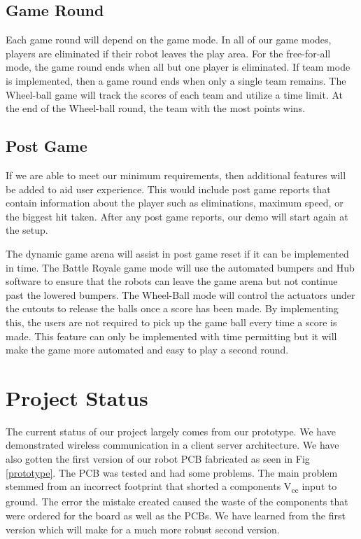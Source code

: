 \documentclass[11pt]{ieeeconf}
\begin{document}
\subsection{Game Round}
Each game round will depend on the game mode. In all of our game modes, players are eliminated if their robot leaves the play area. For the free-for-all mode, the game round ends when all but one player is eliminated. If team mode is implemented, then a game round ends when only a single team remains. The Wheel-ball game will track the scores of each team and utilize a time limit. At the end of the Wheel-ball round, the team with the most points wins.  

\subsection{Post Game}
If we are able to meet our minimum requirements, then additional features will be added to aid user experience. This would include post game reports that contain information about the player such as eliminations, maximum speed, or the biggest hit taken. After any post game reports, our demo will start again at the setup.

The dynamic game arena will assist in post game reset if it can be implemented in time. The Battle Royale game mode will use the automated bumpers and Hub software to ensure that the robots can leave the game arena but not continue past the lowered bumpers. The Wheel-Ball mode will control the actuators under the cutouts to release the balls once a score has been made. By implementing this, the users are not required to pick up the game ball every time a score is made. This feature can only be implemented with time permitting but it will make the game more automated and easy to play a second round. 

\section{Project Status}
The current status of our project largely comes from our prototype. We have demonstrated wireless communication in a client server architecture. We have also gotten the first version of our robot PCB fabricated as seen in Fig \ref{prototype}. The PCB was tested and had some problems. The main problem stemmed from an incorrect footprint that shorted a components V\textsubscript{cc} input to ground. The error the mistake created caused the waste of the components that were ordered for the board as well as the PCBs. We have learned from the first version which will make for a much more robust second version.
\end{document}
